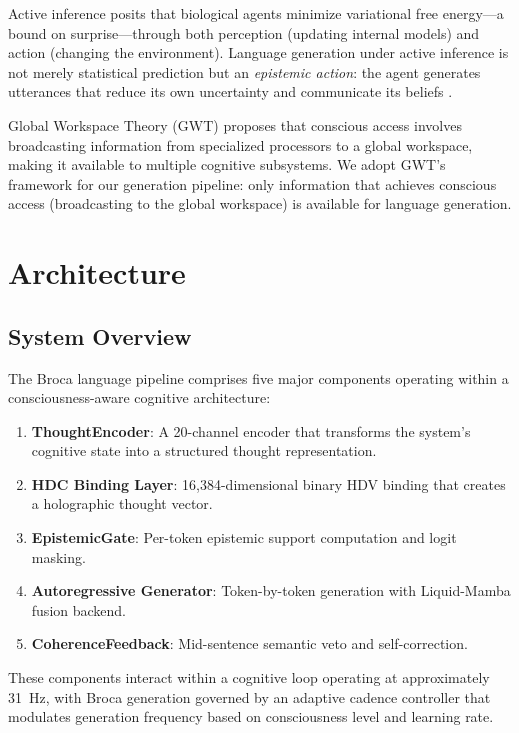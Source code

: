 \documentclass[12pt,a4paper]{article}
\begin{document}
Active inference \citep{friston2010free} posits that biological agents minimize variational free energy---a bound on surprise---through both perception (updating internal models) and action (changing the environment). Language generation under active inference is not merely statistical prediction but an \emph{epistemic action}: the agent generates utterances that reduce its own uncertainty and communicate its beliefs \citep{friston2010free}.

Global Workspace Theory (GWT) \citep{baars1988cognitive, dehaene2014consciousness} proposes that conscious access involves broadcasting information from specialized processors to a global workspace, making it available to multiple cognitive subsystems. We adopt GWT's framework for our generation pipeline: only information that achieves conscious access (broadcasting to the global workspace) is available for language generation.

\section{Architecture}

\subsection{System Overview}

The Broca language pipeline comprises five major components operating within a consciousness-aware cognitive architecture:

\begin{enumerate}
    \item \textbf{ThoughtEncoder}: A 20-channel encoder that transforms the system's cognitive state into a structured thought representation.
    \item \textbf{HDC Binding Layer}: 16,384-dimensional binary HDV binding that creates a holographic thought vector.
    \item \textbf{EpistemicGate}: Per-token epistemic support computation and logit masking.
    \item \textbf{Autoregressive Generator}: Token-by-token generation with Liquid-Mamba fusion backend.
    \item \textbf{CoherenceFeedback}: Mid-sentence semantic veto and self-correction.
\end{enumerate}

These components interact within a cognitive loop operating at approximately 31~Hz, with Broca generation governed by an adaptive cadence controller that modulates generation frequency based on consciousness level and learning rate.
\end{document}
